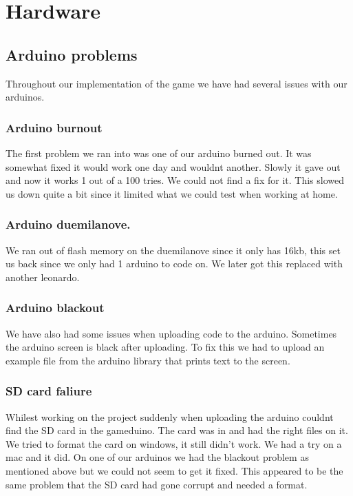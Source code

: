 \section{Hardware}

\subsection{Arduino problems}
Throughout our implementation of the game we have had several issues with our arduinos.

\subsubsection{Arduino burnout}
The first problem we ran into was one of our arduino burned out. It was somewhat fixed it would work one day and wouldnt another. Slowly it gave out and now it works 1 out of a 100 tries. We could not find a fix for it. This slowed us down quite a bit since it limited what we could test when working at home.
\subsubsection{Arduino duemilanove.}
We ran out of flash memory on the duemilanove since it only has 16kb, this set us back since we only had 1 arduino to code on. We later got this replaced with another leonardo.
\subsubsection{Arduino blackout}
We have also had some issues when uploading code to the arduino. Sometimes the arduino screen is black after uploading. To fix this we had to upload an example file from the arduino library that prints text to the screen.
\subsubsection{SD card faliure}
Whilest working on the project suddenly when uploading the arduino couldnt find the SD card in the gameduino. The card was in and had the right files on it. We tried to format the card on windows, it still didn't work. We had a try on a mac and it did.
On one of our arduinos we had the blackout problem as mentioned above but we could not seem to get it fixed. This appeared to be the same problem that the SD card had gone corrupt and needed a format.


